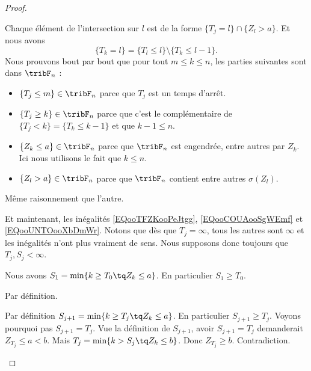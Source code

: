 \begin{proof}
\begin{subproof}
		Chaque élément de l'intersection sur \( l\) est de la forme \( \{ T_j=l \}\cap \{ Z_l>a \}\). Et nous avons
		\begin{equation}
			\{ T_k=l \}=\{ T_l\leq l \}\setminus \{ T_k\leq l-1 \}.
		\end{equation}
		Nous prouvons  bout par bout que pour tout \( m\leq k\leq n\), les parties suivantes sont dans \( \tribF_n\) :
		\begin{itemize}
			\item
			      \( \{ T_j\leq m \}\in\tribF_n\) parce que \( T_j\) est un temps d'arrêt.
			\item
			      \( \{ T_j\geq k \}\in\tribF_n\) parce que c'est le complémentaire de \( \{ T_j<k \}=\{ T_k\leq k-1 \}\) et que \( k-1\leq n\).
			\item
			      \( \{ Z_k\leq a \}\in\tribF_n\) parce que \( \tribF_n\) est engendrée, entre autres par \( Z_k\). Ici nous utilisons le fait que \( k\leq n\).
			\item
			      \( \{ Z_l>a \}\in\tribF_n\) parce que \( \tribF_n\) contient entre autres \( \sigma(Z_l)\).
		\end{itemize}


		Même raisonnement que l'autre.
	\end{subproof}
	Et maintenant, les inégalités \eqref{EQooTFZKooPeJtgg}, \eqref{EQooCOUAooSgWEmf} et \eqref{EQooUNTOooXbDmWr}. Notons que dès que \( T_j=\infty\), tous les autres sont \( \infty\) et les inégalités n'ont plus vraiment de sens. Nous supposons donc toujours que \( T_j,S_j<\infty\).

	\begin{subproof}
		\spitem[\( T_0\leq S_1\)]
		Nous avons \( S_1=\min\{ k\geq T_0\tq Z_k\leq a \}\). En particulier \( S_1\geq T_0\).

		\spitem[\( S_1<T_1\)]
		Par définition.

		\spitem[\( T_j<S_{j+1}\) si \( j\geq 1\)]
		Par définition \( S_{j+1}=\min\{ k\geq T_j\tq Z_k\leq a \}\). En particulier \( S_{j+1}\geq T_j\). Voyons pourquoi pas \( S_{j+1}=T_j\). Vue la définition de \( S_{j+1}\), avoir \( S_{j+1}=T_j\) demanderait \( Z_{T_j}\leq a<b\). Mais \( T_j=\min\{ k>S_j\tq Z_k\leq b \}\). Donc \( Z_{T_j}\geq b\). Contradiction.


\end{subproof}
\end{proof}

